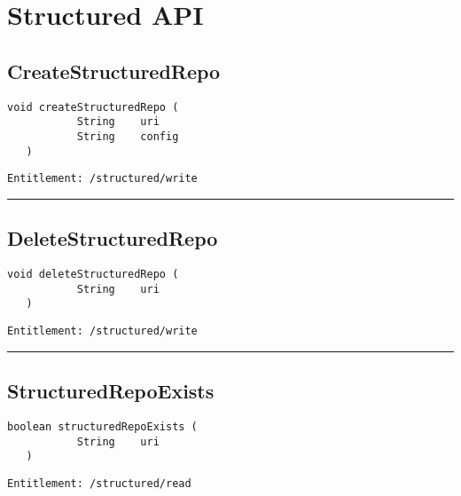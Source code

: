 \chapter{Structured API}

\section{CreateStructuredRepo}
\label{Api:CreateStructuredRepo}
\begin{lstlisting}[style=nonumbers]
   void createStructuredRepo (
           String    uri
           String    config
   )
\end{lstlisting}
\begin{Verbatim}[formatcom=\color{Maroon}]
  Entitlement: /structured/write
\end{Verbatim}



\rule{12cm}{2pt}
\section{DeleteStructuredRepo}
\label{Api:DeleteStructuredRepo}
\begin{lstlisting}[style=nonumbers]
   void deleteStructuredRepo (
           String    uri
   )
\end{lstlisting}
\begin{Verbatim}[formatcom=\color{Maroon}]
  Entitlement: /structured/write
\end{Verbatim}



\rule{12cm}{2pt}
\section{StructuredRepoExists}
\label{Api:StructuredRepoExists}
\begin{lstlisting}[style=nonumbers]
   boolean structuredRepoExists (
           String    uri
   )
\end{lstlisting}
\begin{Verbatim}[formatcom=\color{Maroon}]
  Entitlement: /structured/read
\end{Verbatim}



